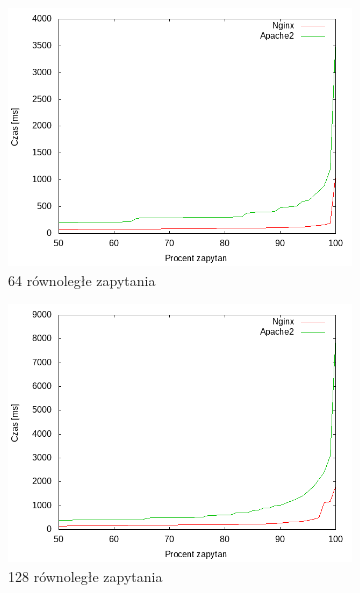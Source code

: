 \begin{figure}
	\begin{subfigure}[h]{0.3\textwidth}
		\includegraphics[width=\textwidth]{testy/wybor_index_duzy_64.png}
		\caption{64 równoległe zapytania}
	\end{subfigure}
	\begin{subfigure}[h]{0.3\textwidth}
		\includegraphics[width=\textwidth]{testy/wybor_index_duzy_128.png}
		\caption{128 równoległe zapytania}
	\end{subfigure}
	\begin{subfigure}[h]{0.3\textwidth}

\end{subfigure}
\end{figure}
